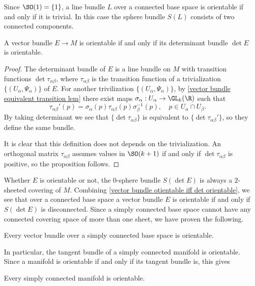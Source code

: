 \begin{remark}
Since $\SO(1)=\{1\}$, a line bundle $L$ over a connected base space is orientable if and only if it is trivial. In this case the sphere bundle $S(L)$ consists of two connected components.
\end{remark}
\begin{proposition}\label{vector bundle otientable iff det orientable}
A vector bundle $E\to M$ is orientable if and only if its determinant bundle $\det E$ is orientable.
\end{proposition}
\begin{proof}
The determinant bundle of $E$ is a line bundle on $M$ with transition functions $\det\tau_{\alpha\beta}$, where $\tau_{\alpha\beta}$ is the transition function of a 
trivialization $\{(U_\alpha,\varPsi_\alpha)\}$ of $E$. For another trivilization $\{(U_\alpha,\varPsi_\alpha)\}$, by \cref{vector bundle equivalent transition lem} 
there exist maps $\sigma_\alpha:U_\alpha\to\GL_k(\R)$ such that
\[\tau_{\alpha\beta}'(p)=\sigma_\alpha(p)\tau_{\alpha\beta}(p)\sigma^{-1}_{\beta}(p),\quad p\in U_\alpha\cap U_\beta.\]
By taking determinant we see that $\{\det\tau_{\alpha\beta}\}$ is equivalent to $\{\det\tau_{\alpha\beta}'\}$, so they define the same bundle.\par 
It is clear that this definition does not depends on the trivialization. An orthogonal matrix $\tau_{\alpha\beta}$ assumes values in $\SO(k+1)$ if and only if 
$\det\tau_{\alpha\beta}$ is positive, so the proposition follows.
\end{proof}
Whether $E$ is orientable or not, the $0$-sphere bundle $S(\det E)$ is always a $2$-sheeted covering of $M$. Combining \cref{vector bundle otientable iff det orientable}, 
we see that over a connected base space a vector bundle $E$ is orientable if and only if $S(\det E)$ is disconnected. Since a simply connected base space cannot have 
any connected covering space of more than one sheet, we have proven the following.
\begin{proposition}\label{vector bundle on simply connected orientable}
Every vector bundle over a simply connected base space is orientable.
\end{proposition}
In particular, the tangent bundle of a simply connected manifold is orientable. Since a manifold is orientable if and only if its tangent bundle is, this gives
\begin{corollary}
Every simply connected manifold is orientable.
\end{corollary}
